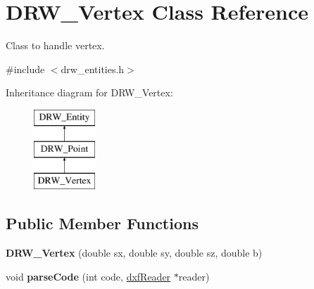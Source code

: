 \hypertarget{classDRW__Vertex}{\section{D\-R\-W\-\_\-\-Vertex Class Reference}
\label{classDRW__Vertex}
}


Class to handle vertex.  




{\ttfamily \#include $<$drw\-\_\-entities.\-h$>$}

Inheritance diagram for D\-R\-W\-\_\-\-Vertex\-:\begin{figure}[H]
\begin{center}
\leavevmode
\includegraphics[height=3.000000cm]{classDRW__Vertex}
\end{center}
\end{figure}
\subsection*{Public Member Functions}
\begin{DoxyCompactItemize}
\item 
\hypertarget{classDRW__Vertex_a42a7f75e8f910086eaf61e266c01909a}{{\bfseries D\-R\-W\-\_\-\-Vertex} (double sx, double sy, double sz, double b)}\label{classDRW__Vertex_a42a7f75e8f910086eaf61e266c01909a}

\item 
\hypertarget{classDRW__Vertex_aee235cd666fc31fcd1d5e807a150a5be}{void {\bfseries parse\-Code} (int code, \hyperlink{classdxfReader}{dxf\-Reader} $\ast$reader)}\label{classDRW__Vertex_aee235cd666fc31fcd1d5e807a150a5be}

\end{DoxyCompactItemize}
